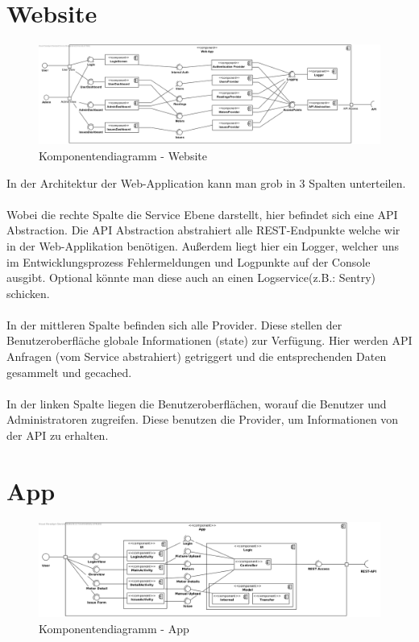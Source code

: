 
\section{Website}

\begin{figure}[h]
	\includegraphics[scale = 0.45]{./img/diagrams/Website-Components} 	
	\caption{Komponentendiagramm - Website} 
\end{figure}

In der Architektur der Web-Application kann man grob in 3 Spalten unterteilen. 
\\ \\
Wobei die rechte Spalte die Service Ebene darstellt, hier befindet sich eine API Abstraction. Die API Abstraction abstrahiert alle REST-Endpunkte welche wir in der Web-Applikation benötigen. Außerdem liegt hier ein Logger, welcher uns im Entwicklungsprozess Fehlermeldungen und Logpunkte auf der Console ausgibt. Optional könnte man diese auch an einen Logservice(z.B.: Sentry) schicken.
\\ \\
In der mittleren Spalte befinden sich alle Provider. Diese stellen der Benutzeroberfläche globale Informationen (state) zur Verfügung. Hier werden API Anfragen (vom Service abstrahiert) getriggert und die entsprechenden Daten gesammelt und gecached.
\\ \\
In der linken Spalte liegen die Benutzeroberflächen, worauf die Benutzer und Administratoren zugreifen. Diese benutzen die Provider, um Informationen von der API zu erhalten.

\newpage

\section{App}

\begin{figure}[h]
\includegraphics[scale=0.45]{img/diagrams/AppComponentDiagram}\caption{Komponentendiagramm - App}  
\end{figure}

